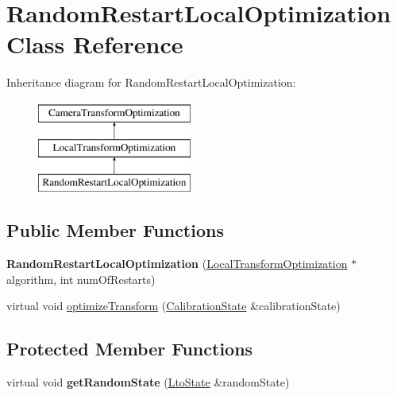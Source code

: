 \hypertarget{classRandomRestartLocalOptimization}{\section{\-Random\-Restart\-Local\-Optimization \-Class \-Reference}
\label{classRandomRestartLocalOptimization}
}
\-Inheritance diagram for \-Random\-Restart\-Local\-Optimization\-:\begin{figure}[H]
\begin{center}
\leavevmode
\includegraphics[height=3.000000cm]{classRandomRestartLocalOptimization}
\end{center}
\end{figure}
\subsection*{\-Public \-Member \-Functions}
\begin{DoxyCompactItemize}
\item 
\hypertarget{classRandomRestartLocalOptimization_a54dd1d298dfbe907561947a2d0a707cf}{{\bfseries \-Random\-Restart\-Local\-Optimization} (\hyperlink{classLocalTransformOptimization}{\-Local\-Transform\-Optimization} $\ast$algorithm, int num\-Of\-Restarts)}\label{classRandomRestartLocalOptimization_a54dd1d298dfbe907561947a2d0a707cf}

\item 
virtual void \hyperlink{classRandomRestartLocalOptimization_a6e5936d8717ed841becb50c1f04ee388}{optimize\-Transform} (\hyperlink{classCalibrationState}{\-Calibration\-State} \&calibration\-State)
\end{DoxyCompactItemize}
\subsection*{\-Protected \-Member \-Functions}
\begin{DoxyCompactItemize}
\item 
\hypertarget{classRandomRestartLocalOptimization_ab1f05a0784715b172217af54a934be14}{virtual void {\bfseries get\-Random\-State} (\hyperlink{classLtoState}{\-Lto\-State} \&random\-State)}\label{classRandomRestartLocalOptimization_ab1f05a0784715b172217af54a934be14}

\end{DoxyCompactItemize}


